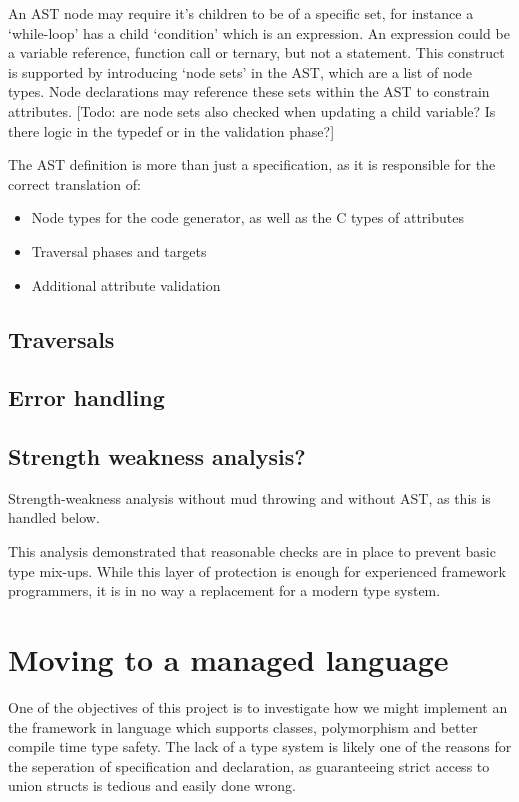 \documentclass[final,a4paper,12pt]{article}
\begin{document}
An AST node may require it's children to be of a specific set, for instance a `while-loop' has a child `condition' which is an expression. An expression could be a variable reference, function call or ternary, but not a statement. This construct is supported by introducing `node sets' in the AST, which are a list of node types. Node declarations may reference these sets within the AST to constrain attributes. [Todo: are node sets also checked when updating a child variable? Is there logic in the typedef or in the validation phase?]

The AST definition is more than just a specification, as it is responsible for the correct translation of:
\begin{itemize}
	\item Node types for the code generator, as well as the C types of attributes
	\item Traversal phases and targets
	\item Additional attribute validation
\end{itemize}

\subsection{Traversals}
\subsection{Error handling}
\subsection{Strength weakness analysis?}
Strength-weakness analysis without mud throwing and without AST, as this is handled below.

This analysis demonstrated that reasonable checks are in place to prevent basic type mix-ups. While this layer of protection is enough for experienced framework programmers, it is in no way a replacement for a modern type system.


\section{Moving to a managed language}
One of the objectives of this project is to investigate how we might implement an the framework in language which supports classes, polymorphism and better compile time type safety. The lack of a type system is likely one of the reasons for the seperation of specification and declaration, as guaranteeing strict access to union structs is tedious and easily done wrong.
\end{document}
